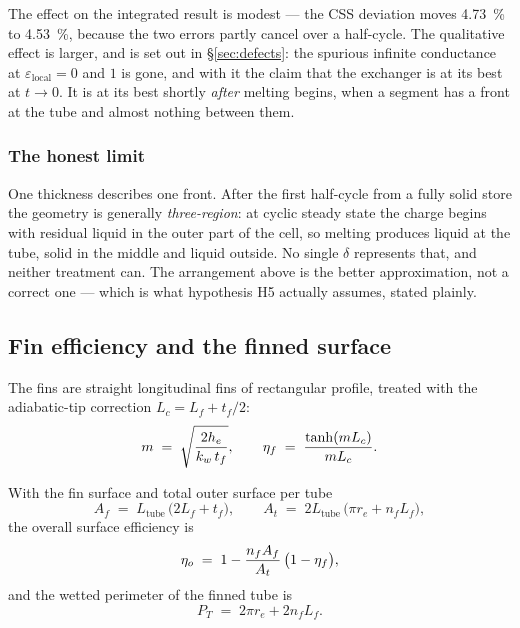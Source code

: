 \medskip
\noindent
The effect on the integrated result is modest --- the CSS deviation moves
\SI{+4.73}{\percent} to \SI{+4.53}{\percent}, because the two errors partly
cancel over a half-cycle. The qualitative effect is larger, and is set out in
\S\ref{sec:defects}: the spurious infinite conductance at
$\varepsilon_{\mathrm{local}}=0$ and $1$ is gone, and with it the claim that the
exchanger is at its best at $t\to0$. It is at its best shortly \emph{after}
melting begins, when a segment has a front at the tube and almost nothing
between them.

\subsubsection*{The honest limit}

One thickness describes one front. After the first half-cycle from a fully solid
store the geometry is generally \emph{three-region}: at cyclic steady state the
charge begins with residual liquid in the outer part of the cell, so melting
produces liquid at the tube, solid in the middle and liquid outside. No single
$\delta$ represents that, and neither treatment can. The arrangement above is
the better approximation, not a correct one --- which is what hypothesis H5
actually assumes, stated plainly.

\subsection{Fin efficiency and the finned surface}
\label{sec:network:fins}

The fins are straight longitudinal fins of rectangular profile, treated with the
adiabatic-tip correction $L_{c}=L_{f}+t_{f}/2$:
\begin{equation}
  m \;=\; \sqrt{\frac{2h_{e}}{k_{w}\,t_{f}}},
  \qquad
  \eta_{f} \;=\; \frac{\tanh(m L_{c})}{m L_{c}} .
  \label{eq:fin-eff}
\end{equation}

With the fin surface and total outer surface per tube
\begin{equation}
  A_{f} \;=\; L_{\mathrm{tube}}\,\bigl(2L_{f}+t_{f}\bigr),
  \qquad
  A_{t} \;=\; 2L_{\mathrm{tube}}\,\bigl(\pi r_{e} + n_{f} L_{f}\bigr),
  \label{eq:areas}
\end{equation}
the overall surface efficiency is
\begin{equation}
  \eta_{o} \;=\; 1 - \frac{n_{f}A_{f}}{A_{t}}\,\bigl(1-\eta_{f}\bigr),
  \label{eq:eta-o}
\end{equation}
and the wetted perimeter of the finned tube is
\begin{equation}
  P_{T} \;=\; 2\pi r_{e} + 2 n_{f} L_{f} .
  \label{eq:perim}
\end{equation}

